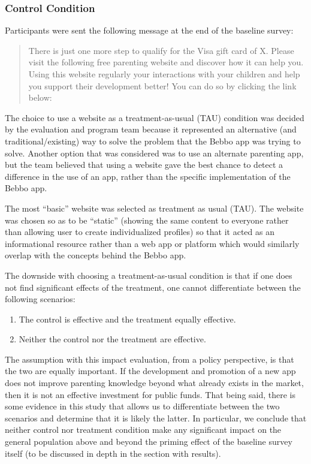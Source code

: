 \subsubsection*{Control Condition}
Participants were sent the following message at the end of the baseline survey:

\begin{quote}
There is just one more step to qualify for the Visa gift card of X. Please visit the following free parenting website and discover how it can help you. Using this website regularly your interactions with your children and help you support their development better! You can do so by clicking the link below:
\end{quote}

The choice to use a website as a treatment-as-usual (TAU) condition was decided by the evaluation and program team because it represented an alternative (and traditional/existing) way to solve the problem that the Bebbo app was trying to solve. Another option that was considered was to use an alternate parenting app, but the team believed that using a website gave the best chance to detect a difference in the use of an app, rather than the specific implementation of the Bebbo app.

The most “basic” website was selected as treatment as usual (TAU). The website was chosen so as to be “static” (showing the same content to everyone rather than allowing user to create individualized profiles) so that it acted as an informational resource rather than a web app or platform which would similarly overlap with the concepts behind the Bebbo app.

The downside with choosing a treatment-as-usual condition is that if one does not find significant effects of the treatment, one cannot differentiate between the following scenarios:

\begin{enumerate}
\item The control is effective and the treatment equally effective.
\item Neither the control nor the treatment are effective.
\end{enumerate}

The assumption with this impact evaluation, from a policy perspective, is that the two are equally important. If the development and promotion of a new app does not improve parenting knowledge beyond what already exists in the market, then it is not an effective investment for public funds. That being said, there is some evidence in this study that allows us to differentiate between the two scenarios and determine that it is likely the latter. In particular, we conclude that neither control nor treatment condition make any significant impact on the general population above and beyond the priming effect of the baseline survey itself (to be discussed in depth in the section with results).


